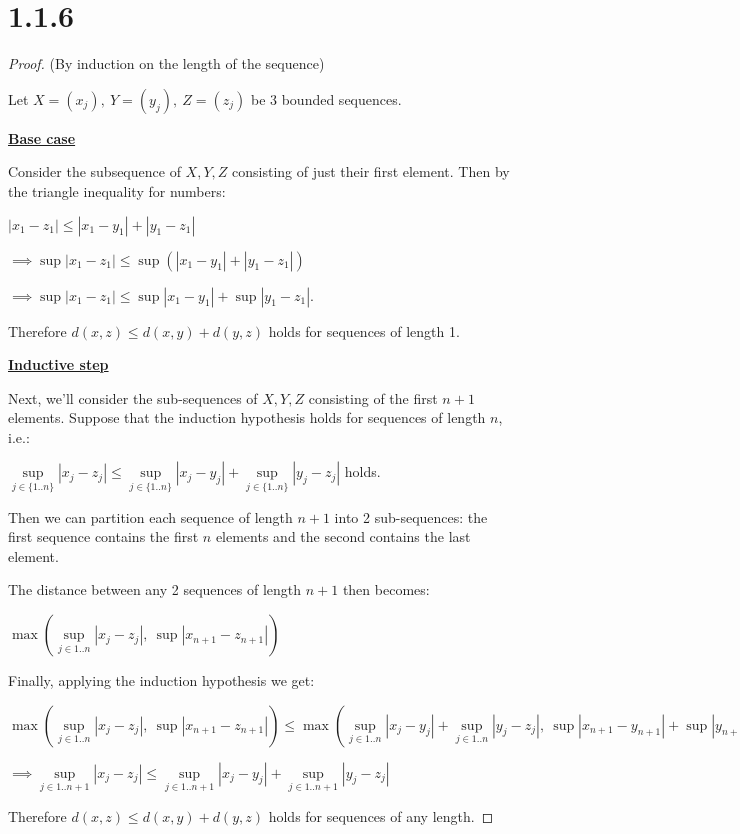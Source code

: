 \documentclass{article}
\begin{document}
\section*{1.1.6}

\begin{proof}{(By induction on the length of the sequence)}
  $ $

  Let $X=(x_j), \ Y=(y_j), \ Z=(z_j)$ be 3 bounded sequences.
  \newline

  \textbf{\underline{Base case}}

  Consider the subsequence of $X,Y,Z$ consisting of just their first element. Then by the triangle inequality for numbers:

  \qquad $|x_1 - z_1| \leq |x_1 - y_1| + |y_1 - z_1|$

  $\implies \sup |x_1 - z_1| \leq \sup (|x_1 - y_1| + |y_1 - z_1|)$

  $\implies \sup |x_1 - z_1| \leq \sup |x_1 - y_1| + \sup |y_1 - z_1|$.
\newline

  Therefore $d(x,z) \leq d(x,y) + d(y,z)$ holds for sequences of length 1.
  \newline

\textbf{\underline{Inductive step}}

Next, we'll consider the sub-sequences of $X,Y,Z$ consisting of the first $n+1$ elements. Suppose that the induction hypothesis holds for sequences of length $n$, i.e.:

\qquad $\sup\limits_{j \in \{1..n\}} |x_j - z_j| \leq \sup\limits_{j \in \{1..n\}} |x_j - y_j| + \sup\limits_{j \in \{1..n\}} |y_j - z_j|$ holds.
\newline

Then we can partition each sequence of length $n+1$ into 2 sub-sequences: the first sequence contains the first $n$ elements and the second contains the last element.
\newline

The distance between any 2 sequences of length $n+1$ then becomes:

\qquad$\max(\sup \limits_{j \in 1..n} |x_j - z_j|, \ \sup |x_{n+1} - z_{n+1}|)$
\newline

Finally, applying the induction hypothesis we get:

\qquad$\max(\sup \limits_{j \in 1..n} |x_j - z_j|, \ \sup |x_{n+1} - z_{n+1}|) \leq \max(\sup\limits_{j \in 1..n} |x_j-y_j| + \sup\limits_{j \in 1..n} |y_j-z_j|, \ \sup |x_{n+1} - y_{n+1}| + \sup |y_{n+1} - z_{n+1}|)$
\newline

$\implies \sup\limits_{j \in 1..n+1} |x_j - z_j| \leq \sup \limits_{j \in 1..n+1} |x_j-y_j| + \sup \limits_{j \in 1..n+1} |y_j-z_j|$
\newline

Therefore $d(x,z) \leq d(x,y) + d(y,z)$ holds for sequences of any length.

\end{proof}
\end{document}
